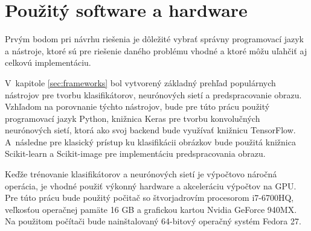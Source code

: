 
\section{Použitý software a hardware}
\label{sec:softwarehardware}
Prvým bodom pri návrhu riešenia je dôležité vybrať správny programovací jazyk a nástroje, ktoré sú pre riešenie daného problému vhodné
    a ktoré môžu uľahčiť aj celkovú implementáciu.

V~kapitole \ref{sec:frameworks} bol vytvorený základný prehľad populárnych nástrojov pre tvorbu klasifikátorov, neurónových sietí a predspracovanie obrazu.
Vzhľadom na porovnanie týchto nástrojov, bude pre túto prácu použitý programovací jazyk Python, knižnica Keras pre tvorbu konvolučných neurónových sietí, ktorá
    ako svoj backend bude využívať knižnicu TensorFlow.
A~následne pre klasický prístup ku klasifikácii obrázkov bude použitá knižnica Scikit-learn a Scikit-image pre implementáciu predspracovania obrazu.

Keďže trénovanie klasifikátorov a neurónových sietí je výpočtovo náročná operácia, je vhodné použiť výkonný hardware a akceleráciu výpočtov na GPU.
Pre túto prácu bude použitý počitač so štvorjadrovím procesorom i7-6700HQ, veľkosťou operačnej pamäte 16 GB a grafickou kartou Nvidia GeForce 940MX.
Na použitom počítači bude nainštalovaný 64-bitový operačný systém Fedora 27.
